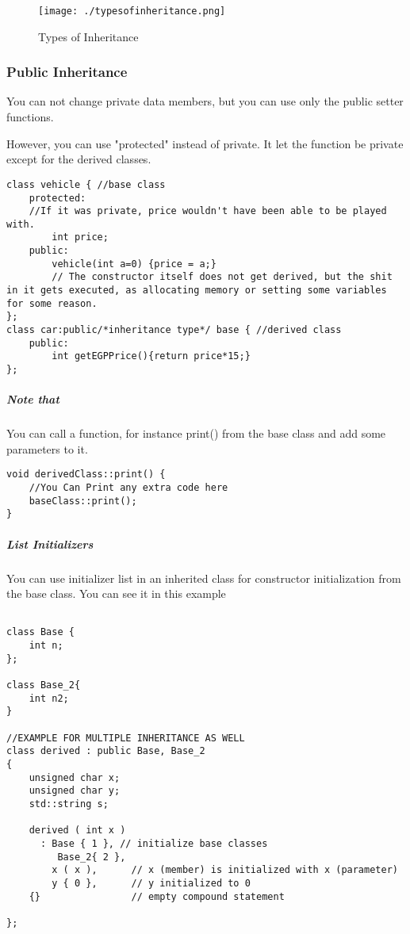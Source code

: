 \documentclass{article}
\begin{document}
\begin{figure}[h]
	\centering
	\texttt{[image: ./typesofinheritance.png]}
	\caption{Types of Inheritance}
	\label{fig:-typesofinheritance-png}
\end{figure}
\subsubsection{Public Inheritance}
You can not change private data members, but you can use only the public setter functions.

However, you can use "protected" instead of private. It let the function be private except for the derived classes.

\begin{lstlisting}
class vehicle { //base class
	protected:
	//If it was private, price wouldn't have been able to be played with.
		int price; 
	public:
		vehicle(int a=0) {price = a;}
		// The constructor itself does not get derived, but the shit in it gets executed, as allocating memory or setting some variables for some reason.
};
class car:public/*inheritance type*/ base { //derived class
	public:
		int getEGPPrice(){return price*15;}
};
\end{lstlisting}

\subparagraph{Note that}

You can call a function, for instance print() from the base class and add some parameters to it.

\begin{lstlisting}
void derivedClass::print() {
	//You Can Print any extra code here
	baseClass::print();
}
\end{lstlisting}

\subparagraph{List Initializers}

You can use initializer list in an inherited class for constructor initialization from the base class. You can see it in this example

\begin{lstlisting}

class Base {
    int n;
};   

class Base_2{
	int n2;
}

//EXAMPLE FOR MULTIPLE INHERITANCE AS WELL
class derived : public Base, Base_2
{
    unsigned char x;
    unsigned char y;
    std::string s;
 
    derived ( int x )
      : Base { 1 }, // initialize base classes
		 Base_2{ 2 },
        x ( x ),      // x (member) is initialized with x (parameter)
        y { 0 },      // y initialized to 0
    {}                // empty compound statement
 
};
\end{lstlisting}
\newpage
\end{document}
